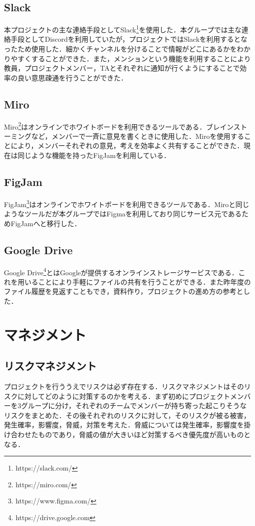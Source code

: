 \subsection{Slack}
本プロジェクトの主な連絡手段としてSlack\footnote{https://slack.com/}を使用した．本グループでは主な連絡手段としてDiscordを利用していたが，プロジェクトではSlackを利用するとなったため使用した．細かくチャンネルを分けることで情報がどこにあるかをわかりやすくすることができた．また，メンションという機能を利用することにより教員，プロジェクトメンバー，TAとそれぞれに通知が行くようにすることで効率の良い意思疎通を行うことができた．

\subsection{Miro}
Miro\footnote{https://miro.com/}はオンラインでホワイトボードを利用できるツールである．ブレインストーミングなど，メンバーで一斉に意見を書くときに使用した．Miroを使用することにより，メンバーそれぞれの意見，考えを効率よく共有することができた．現在は同じような機能を持ったFigJamを利用している．

\subsection{FigJam}
FigJam\footnote{https://www.figma.com/}はオンラインでホワイトボードを利用できるツールである．Miroと同じようなツールだが本グループではFigmaを利用しており同じサービス元であるためFigJamへと移行した．

\subsection{Google Drive}
Google Drive\footnote{https://drive.google.com}とはGoogleが提供するオンラインストレージサービスである．これを用いることにより手軽にファイルの共有を行うことができる．また昨年度のファイル履歴を見返すこともでき，資料作り，プロジェクトの進め方の参考とした．
\pagebreak
\section{マネジメント}
\subsection{リスクマネジメント}
プロジェクトを行ううえでリスクは必ず存在する．リスクマネジメント\cite{risk}はそのリスクに対してどのように対策するのかを考える．まず初めにプロジェクトメンバーを3グループに分け，それぞれのチームでメンバーが持ち寄った起こりそうなリスクをまとめた．その後それぞれのリスクに対して，そのリスクが被る被害，発生確率，影響度，脅威，対策を考えた．脅威については発生確率，影響度を掛け合わせたものであり，脅威の値が大きいほど対策するべき優先度が高いものとなる．

